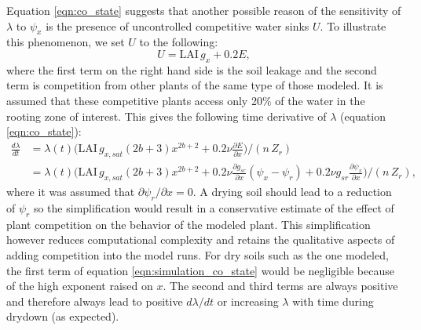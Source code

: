 \documentclass[utf8]{frontiersSCNS} %
\begin{document}
Equation \ref{eqn:co_state} suggests that another possible reason of the sensitivity of $\lambda$ to $\psi_x$ is the presence of uncontrolled competitive water sinks $U$. To illustrate this phenomenon, we set $U$ to the following:
\begin{equation}
    U = \text{LAI} \, g_x + 0.2 E,
    \label{eqn:uncontrolled_losses}
\end{equation}
where the first term on the right hand side is the soil leakage and the second term is competition from other plants of the same type of those modeled. It is assumed that these competitive plants access only 20\% of the water in the rooting zone of interest. This gives the following time derivative of $\lambda$ (equation \ref{eqn:co_state}):
\begin{equation}
    \begin{split}
        \frac{d\lambda}{dt} & = \lambda(t) \Bigg( \text{LAI}\, g_{x,sat} (2b+3) x^{2b+2} + 0.2 \nu \frac{\partial E}{\partial x} \Bigg) / (n\, Z_r)\\
        & = \lambda(t) \Bigg( \text{LAI}\, g_{x,sat} (2b+3) x^{2b+2} + 0.2 \nu \frac{\partial g_{sr}}{\partial x}(\psi_x - \psi_r) + 0.2 \nu g_{sr} \frac{\partial \psi_x}{\partial x} \Bigg) / (n\, Z_r),
    \end{split}
    \label{eqn:simulation_co_state}
\end{equation}
where it was assumed that $\partial \psi_r / \partial x = 0$. A drying soil should lead to a reduction of $\psi_r$ so the simplification would result in a conservative estimate of the effect of plant competition on the behavior of the modeled plant. This simplification however reduces computational complexity and retains the qualitative aspects of adding competition into the model runs. For dry soils such as the one modeled, the first term of equation \ref{eqn:simulation_co_state} would be negligible because of the high exponent raised on $x$. The second and third terms are always positive and therefore always lead to positive $d\lambda/dt$ or increasing $\lambda$ with time during drydown (as expected).
\end{document}
